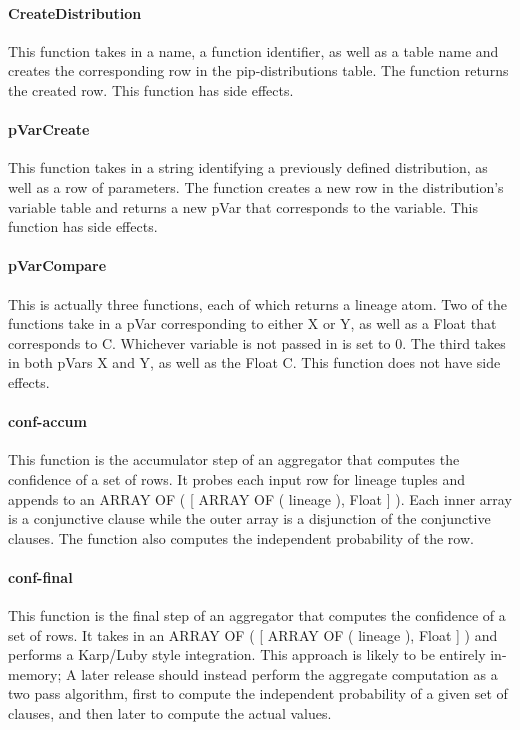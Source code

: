 \paragraph{CreateDistribution} This function takes in a name, a function identifier, as well as a table name and creates the corresponding row in the pip-distributions table.  The function returns the created row.  This function has side effects.

\paragraph{pVarCreate} This function takes in a string identifying a previously defined distribution, as well as a row of parameters.  The function creates a new row in the distribution's variable table and returns a new pVar that corresponds to the variable.  This function has side effects.

\paragraph{pVarCompare} This is actually three functions, each of which returns a lineage atom.  Two of the functions take in a pVar corresponding to either X or Y, as well as a Float that corresponds to C.  Whichever variable is not passed in is set to 0.  The third takes in both pVars X and Y, as well as the Float C.  This function does not have side effects. 

\paragraph{conf-accum} This function is the accumulator step of an aggregator that computes the confidence of a set of rows.  It probes each input row for lineage tuples and appends to an ARRAY OF ( [ ARRAY OF ( lineage ), Float ]  ).  Each inner array is a conjunctive clause while the outer array is a disjunction of the conjunctive clauses.  The function also computes the independent probability of the row.

\paragraph{conf-final} This function is the final step of an aggregator that computes the confidence of a set of rows.  It takes in an ARRAY OF ( [ ARRAY OF ( lineage ), Float ] ) and performs a Karp/Luby style integration.  This approach is likely to be entirely in-memory; A later release should instead perform the aggregate computation as a two pass algorithm, first to compute the independent probability of a given set of clauses, and then later to compute the actual values.